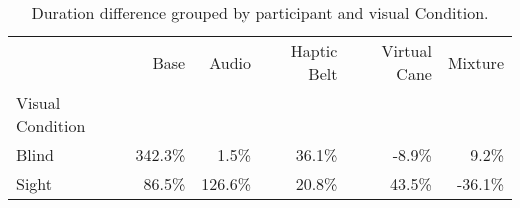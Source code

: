 
\begin{table}[!htb]
\centering
\caption{Duration difference grouped by participant and visual Condition.}
\label{tab:duracao_var_group}
\begin{tabular}{lrrrrr}
\toprule
{} &    Base &   Audio & Haptic Belt & Virtual Cane & Mixture \\
Visual Condition &         &         &             &              &         \\
\midrule
Blind            &  342.3\% &    1.5\% &       36.1\% &        -8.9\% &    9.2\% \\
Sight            &   86.5\% &  126.6\% &       20.8\% &        43.5\% &  -36.1\% \\
\bottomrule
\end{tabular}
\end{table}

